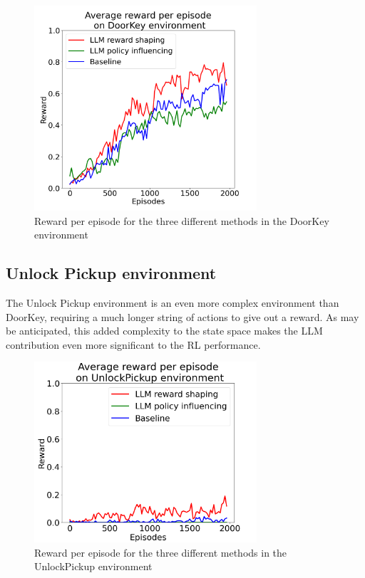 \documentclass[conference]{IEEEtran}
\begin{document}
\begin{figure}[h]
\centerline{\includegraphics[width=3.25in]{figure/doorkeyresults.png}}
\caption{Reward per episode for the three different methods in the DoorKey environment}
\label{doorkeyresults}
\end{figure}

\subsection{Unlock Pickup environment}

The Unlock Pickup environment is an even more complex environment than DoorKey, requiring a much longer string of actions to give out a reward. As may be anticipated, this added complexity to the state space makes the LLM contribution even more significant to the RL performance.

\begin{figure}[h]
\centerline{\includegraphics[width=3.25in]{figure/unlockpickupresults.png}}
\caption{Reward per episode for the three different methods in the UnlockPickup environment}
\label{unlockpickupresults}
\end{figure}
\end{document}
